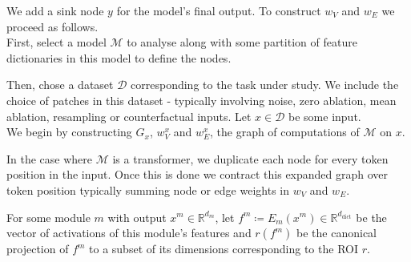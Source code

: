 \documentclass{article}
\newcommand{\R}{\mathbb{R}}
\begin{document}
We add a sink node $y$ for the model's final output. To construct $w_V$ and $w_E$ we proceed as follows.\\

First, select a model $\mathcal{M}$ to analyse along with some partition of feature dictionaries in this model to define the nodes.

Then, chose a dataset $\mathcal{D}$ corresponding to the task under study. We include the choice of patches in this dataset - typically involving noise, zero ablation, mean ablation, resampling or counterfactual inputs. Let $x \in \mathcal{D}$ be some input.\\

We begin by constructing $G_x$, $w_V^x$ and $w_E^x$, the graph of computations of $\mathcal{M}$ on $x$.

In the case where $\mathcal{M}$ is a transformer, we duplicate each node for every token position in the input. Once this is done we contract this expanded graph over token position typically summing node or edge weights in $w_V$ and $w_E$.

For some module $m$ with output $x^m \in \R^{d_{m}}$, let $f^m \coloneq E_m(x^m) \in \R^{d_{\mathrm{dict}}}$ be the vector of activations of this module's features and $r(f^m)$ be the canonical projection of $f^m$ to a subset of its dimensions corresponding to the ROI $r$.
\end{document}
